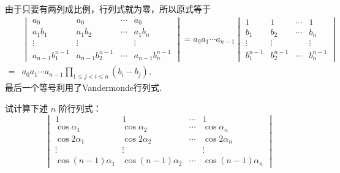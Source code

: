 \begin{sol}
	由于只要有两列成比例，行列式就为零，所以原式等于
	\begin{align*}
		  & {}\begin{vmatrix}
			a_0              & a_0              & \cdots & a_0              \\
			a_1b_1           & a_1b_2           & \cdots & a_1b_n           \\
			\vdots           & \vdots           &        & \vdots           \\
			a_{n-1}b_1^{n-1} & a_{n-1}b_2^{n-1} & \cdots & a_{n-1}b_n^{n-1}
		\end{vmatrix}=a_0a_1\cdots a_{n-1}\begin{vmatrix}
			1         & 1         & \cdots & 1         \\
			b_1       & b_2       & \cdots & b_n       \\
			\vdots    & \vdots    &        & \vdots    \\
			b_1^{n-1} & b_2^{n-1} & \cdots & b_n^{n-1}
		\end{vmatrix} \\
		= & {}a_0a_1\cdots a_{n-1}\prod_{1\le j<i\le n}(b_i-b_j),
	\end{align*}
	最后一个等号利用了Vandermonde行列式.
\end{sol}
\begin{prob}[28]
	试计算下述 $n$ 阶行列式：
	\[
		\begin{vmatrix}
			1                 & 1                 & \cdots & 1                 \\
			\cos\alpha_1      & \cos\alpha_2      & \cdots & \cos\alpha_n      \\
			\cos2\alpha_1     & \cos2\alpha_2     & \cdots & \cos2\alpha_n     \\
			\vdots            & \vdots            &        & \vdots            \\
			\cos(n-1)\alpha_1 & \cos(n-1)\alpha_2 & \cdots & \cos(n-1)\alpha_n
		\end{vmatrix}
	\]
\end{prob}
